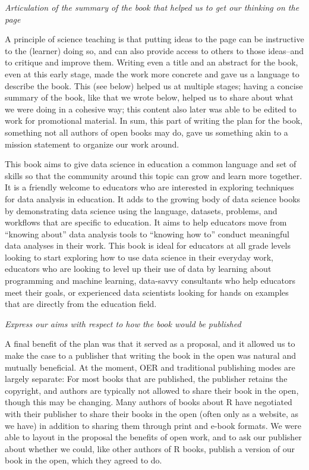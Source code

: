 \documentclass[
  english,
  man]{apa6}
\begin{document}
\emph{Articulation of the summary of the book that helped us to get our thinking on the page}

A principle of science teaching is that putting ideas to the page can be instructive to the (learner) doing so, and can also provide access to others to those ideas--and to critique and improve them. Writing even a title and an abstract for the book, even at this early stage, made the work more concrete and gave us a language to describe the book. This (see below) helped us at multiple stages; having a concise summary of the book, like that we wrote below, helped us to share about what we were doing in a cohesive way; this content also later was able to be edited to work for promotional material. In sum, this part of writing the plan for the book, something not all authors of open books may do, gave us something akin to a mission statement to organize our work around.

This book aims to give data science in education a common language and set of skills so that the community around this topic can grow and learn more together. It is a friendly welcome to educators who are interested in exploring techniques for data analysis in education. It adds to the growing body of data science books by demonstrating data science using the language, datasets, problems, and workflows that are specific to education. It aims to help educators move from ``knowing about'' data analysis tools to ``knowing how to'' conduct meaningful data analyses in their work. This book is ideal for educators at all grade levels looking to start exploring how to use data science in their everyday work, educators who are looking to level up their use of data by learning about programming and machine learning, data-savvy consultants who help educators meet their goals, or experienced data scientists looking for hands on examples that are directly from the education field.

\emph{Express our aims with respect to how the book would be published}

A final benefit of the plan was that it served as a proposal, and it allowed us to make the case to a publisher that writing the book in the open was natural and mutually beneficial. At the moment, OER and traditional publishing modes are largely separate: For most books that are published, the publisher retains the copyright, and authors are typically not allowed to share their book in the open, though this may be changing. Many authors of books about R have negotiated with their publisher to share their books in the open (often only as a website, as we have) in addition to sharing them through print and e-book formats. We were able to layout in the proposal the benefits of open work, and to ask our publisher about whether we could, like other authors of R books, publish a version of our book in the open, which they agreed to do.
\end{document}
